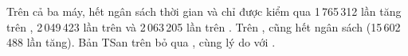 Trên cả ba máy,  hết ngân sách thời gian và chỉ được kiểm qua 1\,765\,312 lần tăng
trên , 2\,049\,423 lần trên  và 2\,063\,205 lần trên
. Trên ,  cũng hết ngân sách (15\,602\,488 lần
tăng). Bản TSan trên  bỏ qua , cùng lý do với
.
